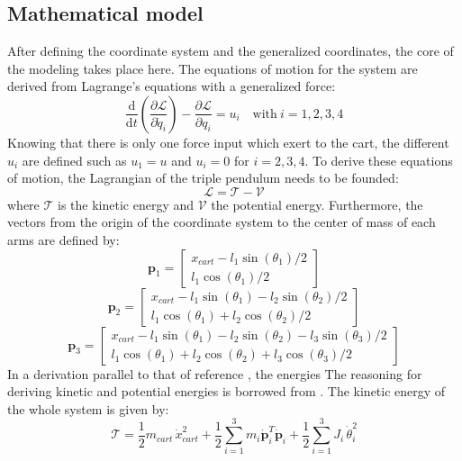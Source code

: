 \documentclass[a4paper,12pt,twoside]{article}
\begin{document}
\subsection{Mathematical model}
After defining the coordinate system and the generalized coordinates, the core of the modeling takes place here. The equations of motion for the system are derived from Lagrange's equations with a generalized force:
\begin{equation} \label{equ:Lagrange_motions}
	\frac{\text{d}}{\text{d}t} \left(\frac{\partial \mathcal{L}}{\partial \dot q_i}\right) - \frac{\partial \mathcal{L}}{\partial q_i} = u_i
	\quad \text{with}\ i=1,2,3,4
\end{equation}
Knowing that there is only one force input which exert to the cart, the different $u_i$ are defined such as $u_1 = u$ and $u_i = 0$ for $i=2,3,4$. To derive these equations of motion, the Lagrangian of the triple pendulum needs to be founded:
\begin{equation}
	\mathcal{L} = \mathcal{T} - \mathcal{V}
\end{equation}
where $\mathcal{T}$ is the kinetic energy and $\mathcal{V}$ the potential energy. Furthermore, the vectors from the origin of the coordinate system to the center of mass of each arms are defined by:
\[
	\mathbf{p}_1 =
	\begin{bmatrix}
		x_{cart} - l_1 \sin(\theta_1)/2 \\
		l_1 \cos(\theta_1)/2
	\end{bmatrix}
\]
\[
	\mathbf{p}_2 =
	\begin{bmatrix}
		x_{cart} - l_1 \sin(\theta_1) - l_2 \sin(\theta_2)/2 \\
		l_1 \cos(\theta_1) + l_2 \cos(\theta_2)/2
	\end{bmatrix}
\]
\[
	\mathbf{p}_3 =
	\begin{bmatrix}
		x_{cart} - l_1 \sin(\theta_1) - l_2 \sin(\theta_2) - l_3 \sin(\theta_3)/2 \\
		l_1 \cos(\theta_1) + l_2 \cos(\theta_2) + l_3 \cos(\theta_3)/2
	\end{bmatrix}
\]
In a derivation parallel to that of reference \cite{}, the energies
The reasoning for deriving kinetic and potential energies is borrowed from \cite{}. The kinetic energy of the whole system is given by:
\begin{equation}
	\mathcal{T} = \frac{1}{2} m_{cart}\, \dot x_{cart}^2 +
		\frac{1}{2} \sum_{i=1}^{3} m_i \mathbf{\dot p}_i^T \mathbf{\dot p}_i +
		\frac{1}{2} \sum_{i=1}^{3} J_i\, \dot\theta_i^2
\end{equation}
\end{document}
